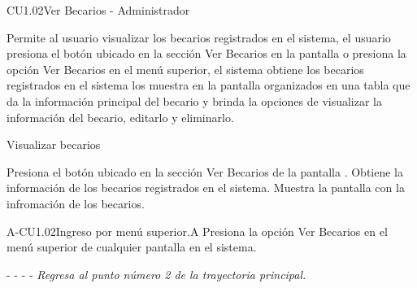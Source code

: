\begin{UseCase}{CU1.02}{Ver Becarios - Administrador }{
    Permite al usuario  visualizar los becarios registrados en el sistema, el usuario presiona el botón  ubicado en la sección  Ver Becarios en la pantalla   o presiona la opción Ver Becarios en el menú superior, el sistema obtiene los becarios registrados en el sistema los muestra en la pantalla  organizados en una tabla que da la información principal del becario y brinda la opciones de visualizar la información del becario, editarlo y eliminarlo. 
    
    \bigskip
}
		
\end{UseCase}
	
	\begin{UCtrayectoria}{Visualizar becarios }
	

	    \UCpaso[\UCactor]Presiona el botón  ubicado en la sección Ver Becarios de la pantalla .
		\UCpaso[\UCsist] Obtiene la información de los becarios registrados en el sistema.
		\UCpaso[\UCsist] Muestra la pantalla  con la infromación de los becarios. 
       
		
	\end{UCtrayectoria}
	

	\begin{UCtrayectoriaA}{A-CU1.02}{Ingreso por menú superior.}{A}
	    \UCpaso[\UCactor]Presiona la opción Ver Becarios en el menú superior de cualquier pantalla en el sistema. %
	    \item[- -] - - {\em Regresa al punto número 2 de la trayectoria principal.}
	\end{UCtrayectoriaA}
	
